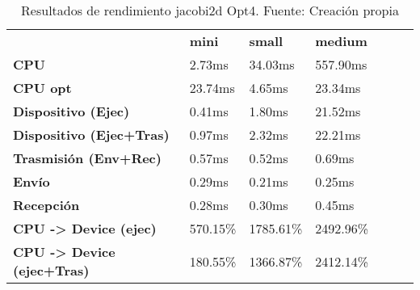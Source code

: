 \begin{table}[H]
    \centering
    \begin{tabular}{lllllll}
    \rowcolor[HTML]{DAE8FC} \ &  \textbf{mini} &  \textbf{	small} &  \textbf{	medium} \\
    \cellcolor[HTML]{DAE8FC} \textbf{CPU} & 2.73ms & 	34.03ms & 	557.90ms \\
    \rowcolor[HTML]{EFEFEF} \cellcolor[HTML]{DAE8FC} \textbf{CPU opt} & 23.74ms & 	4.65ms & 	23.34ms \\
    \cellcolor[HTML]{DAE8FC} \textbf{Dispositivo (Ejec)} & 0.41ms & 	1.80ms & 	21.52ms \\
    \rowcolor[HTML]{EFEFEF} \cellcolor[HTML]{DAE8FC} \textbf{Dispositivo (Ejec+Tras)} & 0.97ms & 	2.32ms & 	22.21ms \\
    \cellcolor[HTML]{DAE8FC} \textbf{Trasmisión (Env+Rec)} & 0.57ms & 	0.52ms & 	0.69ms \\
    \rowcolor[HTML]{EFEFEF} \cellcolor[HTML]{DAE8FC} \textbf{Envío} & 0.29ms & 	0.21ms & 	0.25ms \\
    \cellcolor[HTML]{DAE8FC} \textbf{Recepción} & 0.28ms & 	0.30ms & 	0.45ms \\
    \rowcolor[HTML]{EFEFEF} \cellcolor[HTML]{DAE8FC} \textbf{CPU -> Device (ejec)} & 570.15\% & 	1785.61\% & 	2492.96\% \\
    \cellcolor[HTML]{DAE8FC} \textbf{CPU -> Device (ejec+Tras)} & 180.55\% & 	1366.87\% & 	2412.14\% \\
    \end{tabular}
    \caption[Resultados de rendimiento jacobi2d Opt4]{{Resultados de rendimiento jacobi2d Opt4. Fuente: Creación propia}}
    \label{table_test_jacobi2d_Opt4_hw_performanceResults}
\end{table}
